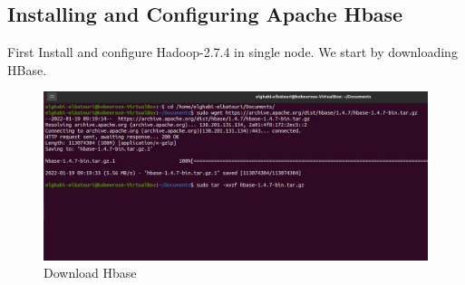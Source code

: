 \begin{spacing}{1.2}
\section{Installing and Configuring Apache Hbase }
\par First Install and configure Hadoop-2.7.4 in single node. We start by downloading HBase.
\\
\begin{figure}[!htb] 
\begin{center} 
\includegraphics[width=1\linewidth]{Pictures/HBase/Configuring Hbase in Standalone & Pseudo-distributed mode/Installing and Configuring Apache Hbase/Download Hbase} 
\end{center} 
\caption{Download Hbase} 
\end{figure}  \FloatBarrier
\\


\end{spacing}
